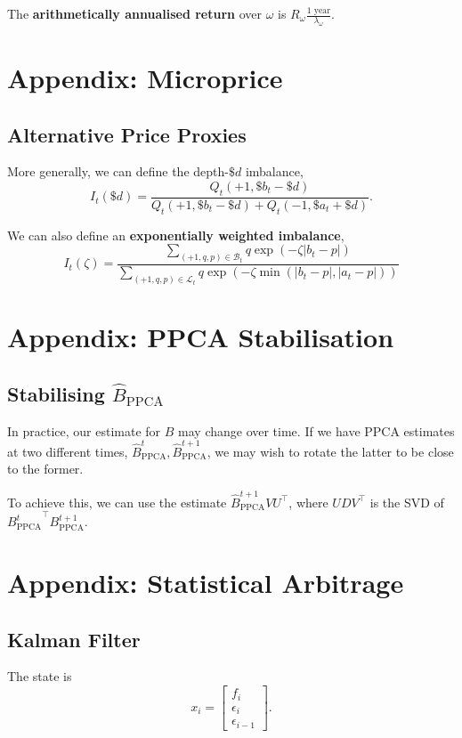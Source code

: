 \documentclass{article}
\begin{document}
The \textbf{arithmetically annualised return} over $\omega$ is $R_\omega \frac{\textrm{1 year}}{\lambda_\omega}$. %


\section{Appendix: Microprice}
\subsection{Alternative Price Proxies}
More generally, we can define the depth-$\$d$ imbalance,
$$I_t(\$d)=\frac{Q_t(+1,\$b_t-\$d)}{Q_t(+1,\$b_t-\$d)+Q_t(-1,\$a_t+\$d)}.$$%

We can also define an \textbf{exponentially weighted imbalance},
$$I_t(\zeta) = \frac{\sum_{(+1,q,p)\in\mathcal{B}_t}q\exp(-\zeta\vert b_t-p\vert)}{\sum_{(+1,q,p)\in\mathcal{L}_t}q\exp(-\zeta\min(\vert b_t-p\vert,\vert a_t-p\vert))}$$%

\section{Appendix: PPCA Stabilisation}
\subsection{Stabilising $\hat{B}_{\textrm{PPCA}}$}
In practice, our estimate for $B$ may change over time. If we have PPCA estimates at two different times, $\hat{B}_{\textrm{PPCA}}^t,\hat{B}_{\textrm{PPCA}}^{t+1}$, we may wish to rotate the latter to be close to the former.

To achieve this, we can use the estimate $\hat{B}_{\textrm{PPCA}}^{t+1}VU^\top$, where $UDV^\top$ is the SVD of ${B_{\textrm{PPCA}}^t}^\top B_{\textrm{PPCA}}^{t+1}$.%

\section{Appendix: Statistical Arbitrage}
\subsection{Kalman Filter}
The state is
$$x_i = \left[\begin{matrix}f_i \\ \epsilon_i \\ \epsilon_{i-1}\end{matrix}\right].$$
\end{document}
